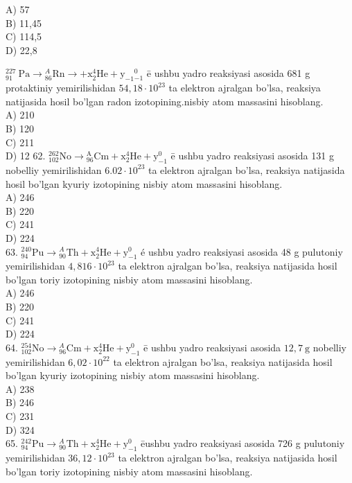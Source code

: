 A) 57\\
B) 11,45\\
C) 114,5\\
D) 22,8
  \item ${ }_{91}^{227} \mathrm{~Pa} \rightarrow{ }_{86}^{A} \mathrm{Rn} \rightarrow+\mathrm{x}_{2}^{4} \mathrm{He}+\mathrm{y}_{-1}{ }_{-1}^{0}$ ē ushbu yadro reaksiyasi asosida 681 g protaktiniy yemirilishidan $54,18 \cdot 10^{23}$ ta elektron ajralgan bo'lsa, reaksiya natijasida hosil bo'lgan radon izotopining.nisbiy atom massasini hisoblang.\\
A) 210\\
B) 120\\
C) 211\\
D) 12
62. ${ }_{102}^{262} \mathrm{No} \rightarrow{ }_{96}^{\mathrm{A}} \mathrm{Cm}+\mathrm{x}_{2}^{4} \mathrm{He}+\mathrm{y}_{-1}^{0}$ ē ushbu yadro reaksiyasi asosida 131 g nobelliy yemirilishidan $6.02 \cdot 10^{23}$ ta elektron ajralgan bo'lsa, reaksiya natijasida hosil bo'lgan kyuriy izotopining nisbiy atom massasini hisoblang.\\
A) 246\\
B) 220\\
C) 241\\
D) 224\\
63. ${ }_{94}^{240} \mathrm{Pu} \rightarrow{ }_{90}^{A} \mathrm{Th}+\mathrm{x}_{2}^{4} \mathrm{He}+\mathrm{y}_{-1}^{0}$ é ushbu yadro reaksiyasi asosida 48 g pulutoniy yemirilishidan $4,816 \cdot 10^{23}$ ta elektron ajralgan bo'lsa, reaksiya natijasida hosil bo'lgan toriy izotopining nisbiy atom massasini hisoblang.\\
A) 246\\
B) 220\\
C) 241\\
D) 224\\
64. ${ }_{102}^{254} \mathrm{No} \rightarrow{ }_{96}^{A} \mathrm{Cm}+\mathrm{x}_{2}^{4} \mathrm{He}+\mathrm{y}_{-1}^{0}$ ē ushbu yadro reaksiyasi asosida $12,7 \mathrm{~g}$ nobelliy yemirilishidan $6,02 \cdot 10^{22}$ ta elektron ajralgan bo'lsa, reaksiya natijasida hosil bo'lgan kyuriy izotopining nisbiy atom massasini hisoblang.\\
A) 238\\
B) 246\\
C) 231\\
D) 324\\
65. ${ }_{94}^{242} \mathrm{Pu} \rightarrow{ }_{90}^{A} \mathrm{Th}+\mathrm{x}_{2}^{4} \mathrm{He}+\mathrm{y}_{-1}^{0}$ ēushbu yadro reaksiyasi asosida 726 g pulutoniy yemirilishidan $36,12 \cdot 10^{23}$ ta elektron ajralgan bo'lsa, reaksiya natijasida hosil bo'lgan toriy izotopining nisbiy atom massasini hisoblang.\\
